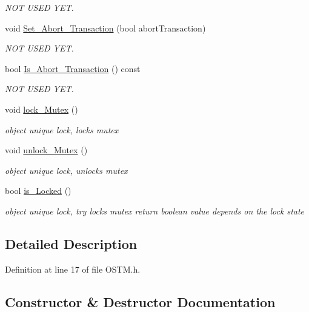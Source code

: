 \begin{DoxyCompactItemize}
\begin{DoxyCompactList}\small\item\em N\+OT U\+S\+ED Y\+ET. \end{DoxyCompactList}\item 
void \hyperlink{class_o_s_t_m_aba384cf65c5f56f5b86833730c3c6ea4}{Set\+\_\+\+Abort\+\_\+\+Transaction} (bool abort\+Transaction)
\begin{DoxyCompactList}\small\item\em N\+OT U\+S\+ED Y\+ET. \end{DoxyCompactList}\item 
bool \hyperlink{class_o_s_t_m_afc2851abf5342c3c67342c2c14820115}{Is\+\_\+\+Abort\+\_\+\+Transaction} () const 
\begin{DoxyCompactList}\small\item\em N\+OT U\+S\+ED Y\+ET. \end{DoxyCompactList}\item 
void \hyperlink{class_o_s_t_m_af192c598a3c647f37aaba5757e60240f}{lock\+\_\+\+Mutex} ()
\begin{DoxyCompactList}\small\item\em object unique lock, locks mutex \end{DoxyCompactList}\item 
void \hyperlink{class_o_s_t_m_a6cd703bc26c719fd95b4f5362d050762}{unlock\+\_\+\+Mutex} ()
\begin{DoxyCompactList}\small\item\em object unique lock, unlocks mutex \end{DoxyCompactList}\item 
bool \hyperlink{class_o_s_t_m_afb6520023ed2c4a6188b688c46f192d0}{is\+\_\+\+Locked} ()
\begin{DoxyCompactList}\small\item\em object unique lock, try locks mutex return boolean value depends on the lock state \end{DoxyCompactList}\end{DoxyCompactItemize}


\subsection{Detailed Description}


Definition at line 17 of file O\+S\+T\+M.\+h.



\subsection{Constructor \& Destructor Documentation}
